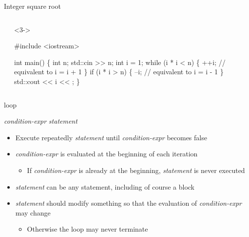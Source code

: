 \begin{frame}[fragile]{Integer square root}
\begin{columns}[T]
\begin{column}{.5\textwidth}
    \end{column}

    \begin{column}{.5\textwidth}
      \begin{codeblock}<3->{
#include <iostream>

int main()
\{
  int n;
  std::cin >> n;
  int i = 1;
  while (i * i < n) \{
    ++i;   // equivalent to i = i + 1
  \}
  if (i * i > n) \{
    --i;   // equivalent to i = i - 1
  \}
  std::cout << i << \bslashn;
\}}\end{codeblock}
    \end{column}

  \end{columns}

\end{frame}

\begin{frame}[fragile]{ loop}

  \begin{center}
     \textit{condition-expr} \code{)} \textit{statement}
  \end{center}

  \pause

  \begin{itemize}[<+->]
  \item Execute repeatedly \textit{statement} until \textit{condition-expr}
    becomes false
  \item \textit{condition-expr} is evaluated at the beginning of each iteration
    \begin{itemize}
    \item If \textit{condition-expr} is already  at the beginning,
      \textit{statement} is never executed
    \end{itemize}
  \item \textit{statement} can be any statement, including of course a block
  \item \textit{statement} should modify something so that the evaluation of
    \textit{condition-expr} may change
    \begin{itemize}[<.->]
    \item Otherwise the loop may never terminate
    \end{itemize}
  \end{itemize}

\end{frame}


